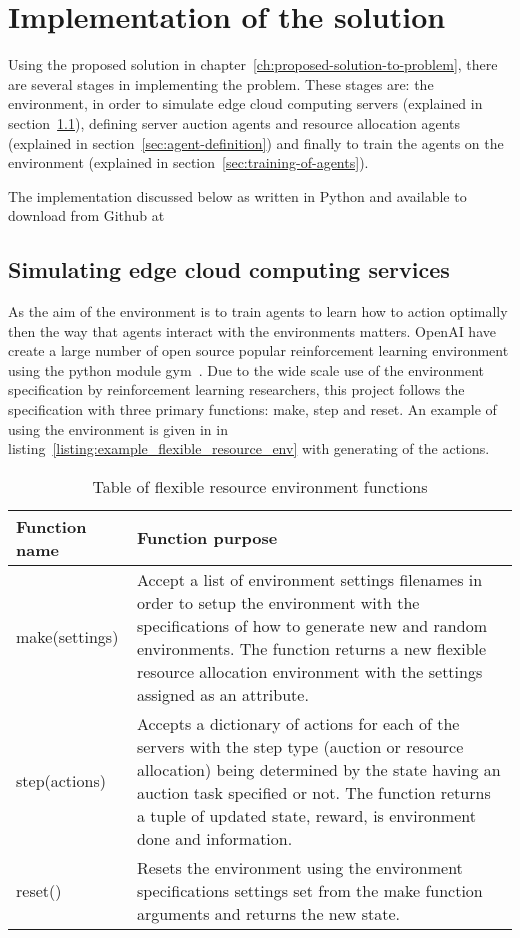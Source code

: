 \chapter{Implementation of the solution}\label{ch:implementation-of-the-solution}
Using the proposed solution in chapter~\ref{ch:proposed-solution-to-problem}, there are several stages in implementing
the problem. These stages are: the environment, in order to simulate edge cloud computing servers
(explained in section~\ref{sec:simulating-edge-cloud-computing-services}), defining server auction agents and
resource allocation agents (explained in section~\ref{sec:agent-definition}) and finally to train the agents on the
environment (explained in section~\ref{sec:training-of-agents}).

The implementation discussed below as written in Python and available to download from Github at

\section{Simulating edge cloud computing services}\label{sec:simulating-edge-cloud-computing-services}
As the aim of the environment is to train agents to learn how to action optimally then the way that agents interact
with the environments matters. OpenAI have create a large number of open source popular reinforcement learning
environment using the python module gym~\citep{openaigym}. Due to the wide scale use of the environment specification
by reinforcement learning researchers, this project follows the specification with three primary functions: make,
step and reset. An example of using the environment is given in in listing~\ref{listing:example_flexible_resource_env}
with generating of the actions.

\begin{table}
    \centering
    \begin{tabular}{|p{3cm}|p{10cm}|} \hline
    Function name & Function purpose \\ \hline
    make(settings) & Accept a list of environment settings filenames in order to setup the environment with the
        specifications of how to generate new and random environments. The function returns a new flexible resource
        allocation environment with the settings assigned as an attribute. \\ \hline
    step(actions) & Accepts a dictionary of actions for each of the servers with the step type (auction or resource
        allocation) being determined by the state having an auction task specified or not. The function returns a tuple
        of updated state, reward, is environment done and information. \\ \hline
    reset() & Resets the environment using the environment specifications settings set from the make function arguments
        and returns the new state. \\ \hline
    \end{tabular}
    \label{tab:env_funcs}
    \caption{Table of flexible resource environment functions}
\end{table}

